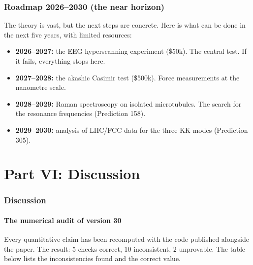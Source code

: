 \documentclass[11pt,a4paper]{article}
\begin{document}
\section{Roadmap 2026--2030 (the near horizon)}
The theory is vast, but the next steps are concrete. Here is what can be done in the next five years, with limited resources:
\begin{itemize}
    \item \textbf{2026--2027:} the EEG hyperscanning experiment (\$50k). The central test. If it fails, everything stops here.
    \item \textbf{2027--2028:} the akashic Casimir test (\$500k). Force measurements at the nanometre scale.
    \item \textbf{2028--2029:} Raman spectroscopy on isolated microtubules. The search for the resonance frequencies (Prediction 158).
    \item \textbf{2029--2030:} analysis of LHC/FCC data for the three KK modes (Prediction 305).
\end{itemize}

\newpage
\part*{Part VI: Discussion}

\section{Discussion}
\subsection{The numerical audit of version 30}
Every quantitative claim has been recomputed with the code published alongside the paper. The result: 5 checks correct, 10 inconsistent, 2 unprovable. The table below lists the inconsistencies found and the correct value.
\end{document}
